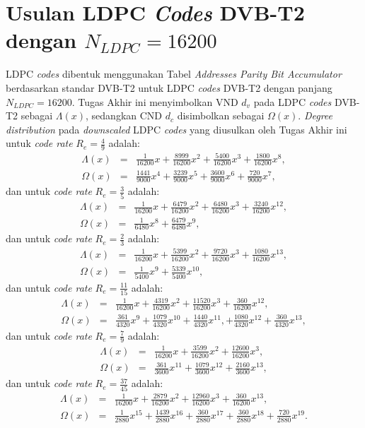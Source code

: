 \section{Usulan LDPC \textit{Codes} DVB-T2 dengan $N_{LDPC}=16200$}
LDPC \textit{codes} dibentuk menggunakan Tabel \textit{Addresses Parity Bit Accumulator} berdasarkan standar DVB-T2 untuk LDPC \textit{codes} DVB-T2 dengan panjang $N_{LDPC}=16200$. Tugas Akhir ini menyimbolkan VND $d_v$ pada LDPC \textit{codes} DVB-T2 sebagai $\Lambda (x)$, sedangkan CND $d_c$ disimbolkan sebagai $\Omega(x)$. \textit{Degree distribution} pada \textit{downscaled} LDPC \textit{codes} yang diusulkan oleh Tugas Akhir ini untuk \textit{code rate} $R_e=\frac{4}{9}$ adalah:
\begin{eqnarray}
\Lambda (x) &=& \frac{1}{16200}x+\frac{8999}{16200}x^2+\frac{5400}{16200}x^3+\frac{1800}{16200}x^8, \\
\Omega(x) &=& \frac{1441}{9000}x^4+\frac{3239}{9000}x^5+\frac{3600}{9000}x^6+\frac{720}{9000}x^7,
\end{eqnarray}
dan untuk \textit{code rate} $R_e=\frac{3}{5}$ adalah:
\begin{eqnarray}
\Lambda (x) &=& \frac{1}{16200}x+\frac{6479}{16200}x^2+\frac{6480}{16200}x^3+\frac{3240}{16200}x^{12},   \\
\Omega(x) &=& \frac{1}{6480}x^8+\frac{6479}{6480}x^9,
\end{eqnarray}
dan untuk \textit{code rate} $R_e=\frac{2}{3}$ adalah:
\begin{eqnarray}
\Lambda (x) &=& \frac{1}{16200}x+\frac{5399}{16200}x^2+\frac{9720}{16200}x^3+\frac{1080}{16200}x^{13},   \\
\Omega(x) &=& \frac{1}{5400}x^{9}+\frac{5339}{5400}x^{10},
\end{eqnarray}
dan untuk \textit{code rate} $R_e=\frac{11}{15}$ adalah:
\begin{eqnarray}
\Lambda (x) &=& \frac{1}{16200}x+\frac{4319}{16200}x^2+\frac{11520}{16200}x^3+\frac{360}{16200}x^{12},   \\
\Omega(x) &=& \frac{361}{4320}x^{9}+\frac{1079}{4320}x^{10}+\frac{1440}{4320}x^{11},+\frac{1080}{4320}x^{12}+\frac{360}{4320}x^{13},
\end{eqnarray}
dan untuk \textit{code rate} $R_e=\frac{7}{9}$ adalah:
\begin{eqnarray}
\Lambda (x) &=& \frac{1}{16200}x+\frac{3599}{16200}x^2+\frac{12600}{16200}x^3,   \\
\Omega(x) &=& \frac{361}{3600}x^{11}+\frac{1079}{3600}x^{12}+\frac{2160}{3600}x^{13},
\end{eqnarray}
dan untuk \textit{code rate} $R_e=\frac{37}{45}$ adalah:
\begin{eqnarray}
\Lambda (x) &=& \frac{1}{16200}x+\frac{2879}{16200}x^2+\frac{12960}{16200}x^3 +\frac{360}{16200}x^{13} , \\
\Omega(x) &=& \frac{1}{2880}x^{15}+\frac{1439}{2880}x^{16}+\frac{360}{2880}x^{17}+\frac{360}{2880}x^{18}+\frac{720}{2880}x^{19}.
\end{eqnarray}

